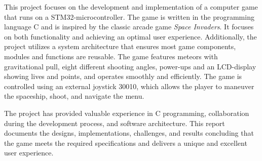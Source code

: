 This project focuses on the development and implementation of a computer game that runs on a STM32-microcontroller. The game is written in the programming language C and is inspired by the classic arcade game \textit{Space Invaders}. It focuses on both functionality and achieving an optimal user experience. Additionally, the project utilizes a system architecture that ensures most game components, modules and functions are reusable.
The game features meteors with gravitational pull, eight different shooting angles, power-ups and an LCD-display showing lives and points, and operates smoothly and efficiently. The game is controlled using an external joystick 30010, which allows the player to maneuver the spaceship, shoot, and navigate the menu. 

The project has provided valuable experience in C programming, collaboration during the development process, and software architecture. This report documents the designs, implementations, challenges, and results concluding that the game meets the required specifications and delivers a unique and excellent user experience.  
